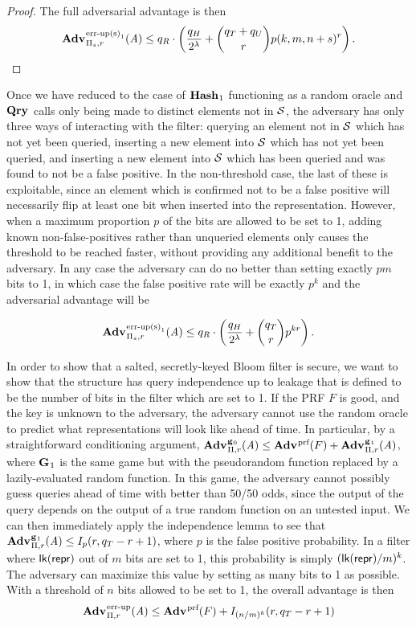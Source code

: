 \begin{proof}
The full adversarial advantage is then
$$\Adv{\erreps_1}_{\struct_s,r}(\advA) \le q_R \cdot \left(\frac{q_H}{2^\lambda} + \binom{q_T+q_U}{r}p(k, m, n+s)^r\right).$$
\missingqed
\end{proof}


Once we have reduced to the case of $\mathbf{Hash}\hspace{0.5pt}_1$ functioning as a random oracle and $\mathbf{Qry}\hspace{0.5pt}$ calls only being made to distinct elements not in $\mathcal{S}$, the adversary has only three ways of interacting with the filter: querying an element not in $\mathcal{S}$ which has not yet been queried, inserting a new element into $\mathcal{S}$ which has not yet been queried, and inserting a new element into $\mathcal{S}$ which has been queried and was found to not be a false positive. In the non-threshold case, the last of these is exploitable, since an element which is confirmed not to be a false positive will necessarily flip at least one bit when inserted into the representation. However, when a maximum proportion $p$ of the bits are allowed to be set to 1, adding known non-false-positives rather than unqueried elements only causes the threshold to be reached faster, without providing any additional benefit to the adversary. In any case the adversary can do no better than setting exactly $pm$ bits to 1, in which case the false positive rate will be exactly $p^k$ and the adversarial advantage will be

$$\Adv{\erreps_1}_{\struct_s,r}(\advA) \le q_R \cdot \left(\frac{q_H}{2^\lambda} + \binom{q_T}{r}p^{kr}\right).$$

In order to show that a salted, secretly-keyed Bloom filter is secure, we want to show that the structure has query independence up to leakage that is defined to be the number of bits in the filter which are set to 1. If the PRF $F$ is good, and the key is unknown to the adversary, the adversary cannot use the random oracle to predict what representations will look like ahead of time. In particular, by a straightforward conditioning argument, $\Adv{\game_0}_{\struct,r}(\advA) \le \Adv{\prf}(F) + \Adv{\game_1}_{\struct,r}(\advA)$, where $\mathbf{G}\hspace{0.5pt}_1$ is the same game but with the pseudorandom function replaced by a lazily-evaluated random function. In this game, the adversary cannot possibly guess queries ahead of time with better than 50/50 odds, since the output of the query depends on the output of a true random function on an untested input. We can then immediately apply the independence lemma to see that $\Adv{\game_1}_{\struct,r}(\advA) \le I_p(r, q_T-r+1)$, where $p$ is the false positive probability. In a filter where $\textsf{lk}(\mathsf{repr})$ out of $m$ bits are set to 1, this probability is simply $(\textsf{lk}(\mathsf{repr})/m)^k$. The adversary can maximize this value by setting as many bits to 1 as possible. With a threshold of $n$ bits allowed to be set to 1, the overall advantage is then
$$\Adv{\errep}_{\struct,r}(\advA) \le \Adv{\prf}(F) + I_{(n/m)^k}(r, q_T-r+1)$$

